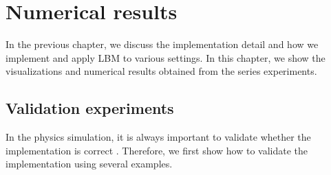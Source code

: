\chapter{Numerical results}
\vspace{-5mm}
In the previous chapter, we discuss the implementation detail
and how we implement and apply LBM to various settings.
In this chapter, we show the visualizations and numerical results
obtained from the series experiments.

\section{Validation experiments}
In the physics simulation, it is always important
to validate whether the implementation is correct
\cite{}.
Therefore, we first show how to validate the implementation
using several examples.

